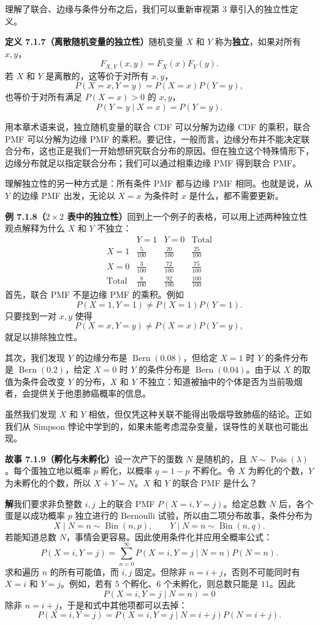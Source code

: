 \documentclass[UTF8,12pt,a4paper,fontset=fandol]{ctexart}
\begin{document}
理解了联合、边缘与条件分布之后，我们可以重新审视第 3 章引入的独立性定义。

\noindent\textbf{定义 7.1.7（离散随机变量的独立性）}\quad 随机变量 $X$ 和 $Y$ 称为\textbf{独立}，如果对所有 $x,y$，
\[
  F_{X,Y}(x,y)=F_X(x)F_Y(y).
\]
若 $X$ 和 $Y$ 是离散的，这等价于对所有 $x,y$，
\[
  P(X=x,Y=y)=P(X=x)P(Y=y),
\]
也等价于对所有满足 $P(X=x)>0$ 的 $x,y$，
\[
  P(Y=y\mid X=x)=P(Y=y).
\]

用本章术语来说，独立随机变量的联合 CDF 可以分解为边缘 CDF 的乘积，联合 PMF 可以分解为边缘 PMF 的乘积。要记住，一般而言，边缘分布并不能决定联合分布，这也正是我们一开始想研究联合分布的原因。但在独立这个特殊情形下，边缘分布就足以指定联合分布；我们可以通过相乘边缘 PMF 得到联合 PMF。

理解独立性的另一种方式是：所有条件 PMF 都与边缘 PMF 相同。也就是说，从 $Y$ 的边缘 PMF 出发，无论以 $X=x$ 为条件时 $x$ 是什么，都不需要更新。

\noindent\textbf{例 7.1.8（$2\times 2$ 表中的独立性）}\quad 回到上一个例子的表格，可以用上述两种独立性观点解释为什么 $X$ 和 $Y$ 不独立：
\[
\begin{array}{c|cc|c}
 & Y=1 & Y=0 & \text{Total}\\ \hline
X=1 & \frac{5}{100} & \frac{20}{100} & \frac{25}{100}\\
X=0 & \frac{3}{100} & \frac{72}{100} & \frac{75}{100}\\ \hline
\text{Total} & \frac{8}{100} & \frac{92}{100} & \frac{100}{100}
\end{array}
\]
首先，联合 PMF 不是边缘 PMF 的乘积。例如
\[
  P(X=1,Y=1)\ne P(X=1)P(Y=1).
\]
只要找到一对 $x,y$ 使得
\[
  P(X=x,Y=y)\ne P(X=x)P(Y=y),
\]
就足以排除独立性。

其次，我们发现 $Y$ 的边缘分布是 $\operatorname{Bern}(0.08)$，但给定 $X=1$ 时 $Y$ 的条件分布是 $\operatorname{Bern}(0.2)$，给定 $X=0$ 时 $Y$ 的条件分布是 $\operatorname{Bern}(0.04)$。由于以 $X$ 的取值为条件会改变 $Y$ 的分布，$X$ 和 $Y$ 不独立：知道被抽中的个体是否为当前吸烟者，会提供关于他患肺癌概率的信息。

虽然我们发现 $X$ 和 $Y$ 相依，但仅凭这种关联不能得出吸烟导致肺癌的结论。正如我们从 Simpson 悖论中学到的，如果未能考虑混杂变量，误导性的关联也可能出现。

\noindent\textbf{故事 7.1.9（孵化与未孵化）}\quad 设一次产下的蛋数 $N$ 是随机的，且 $N\sim \operatorname{Pois}(\lambda)$。每个蛋独立地以概率 $p$ 孵化，以概率 $q=1-p$ 不孵化。令 $X$ 为孵化的个数，$Y$ 为未孵化的个数，所以 $X+Y=N$。$X$ 和 $Y$ 的联合 PMF 是什么？

\noindent\textbf{解}\quad 我们要求非负整数 $i,j$ 上的联合 PMF $P(X=i,Y=j)$。给定总数 $N$ 后，各个蛋是以成功概率 $p$ 独立进行的 Bernoulli 试验，所以由二项分布故事，条件分布为
\[
  X\mid N=n\sim \operatorname{Bin}(n,p),\qquad
  Y\mid N=n\sim \operatorname{Bin}(n,q).
\]
若能知道总数 $N$，事情会更容易。因此使用条件化并应用全概率公式：
\[
  P(X=i,Y=j)=\sum_{n=0}^{\infty}P(X=i,Y=j\mid N=n)P(N=n).
\]
求和遍历 $n$ 的所有可能值，而 $i,j$ 固定。但除非 $n=i+j$，否则不可能同时有 $X=i$ 和 $Y=j$。例如，若有 $5$ 个孵化、$6$ 个未孵化，则总数只能是 $11$。因此
\[
  P(X=i,Y=j\mid N=n)=0
\]
除非 $n=i+j$，于是和式中其他项都可以去掉：
\[
  P(X=i,Y=j)=P(X=i,Y=j\mid N=i+j)P(N=i+j).
\]
\end{document}
